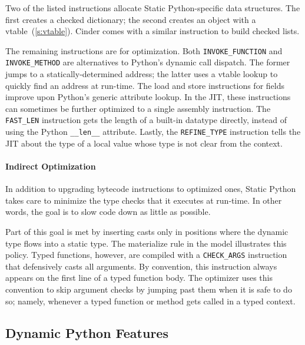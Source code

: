 \documentclass[english,cleveref,submission]{programming}
\newcommand{\SP}{Static Python}
\newcommand{\code}[1]{\texttt{#1}}
\newcommand{\bcinst}[1]{\code{#1}}
\begin{document}
Two of the listed instructions allocate \SP{}-specific data structures.
The first creates a checked dictionary; the second creates an object with a vtable~(\cref{s:vtable}).
Cinder comes with a similar instruction to build checked lists.

The remaining instructions are for optimization.
Both \bcinst{INVOKE\_FUNCTION} and \bcinst{INVOKE\_METHOD} are alternatives
to Python's dynamic call dispatch.
The former jumps to a statically-determined address;
the latter uses a vtable lookup to quickly find an address at run-time.
The load and store instructions for fields improve upon Python's generic attribute lookup.
In the JIT, these instructions can sometimes be further optimized to a single assembly instruction.
The \bcinst{FAST\_LEN} instruction gets the length of a built-in datatype directly, instead
of using the Python \code{\_\_len\_\_} attribute.
Lastly, the \bcinst{REFINE\_TYPE} instruction tells the JIT about the type of a local value whose
type is not clear from the context.


\paragraph{Indirect Optimization}

In addition to upgrading bytecode instructions to optimized ones, \SP{} takes care
to minimize the type checks that it executes at run-time.
In other words, the goal is to slow code down as little as possible.

Part of this goal is met by inserting casts only in positions where the dynamic
type flows into a static type.
The materialize rule in the model illustrates this policy.
Typed functions, however, are compiled with a \bcinst{CHECK\_ARGS} instruction
that defensively casts all arguments.
By convention, this instruction always appears on the first line of a typed
function body.
The optimizer uses this convention to skip argument checks by jumping past them
when it is safe to do so; namely, whenever a typed function or method gets
called in a typed context.


\subsection{Dynamic Python Features}
\label{s:dynamic-python}

\end{document}
